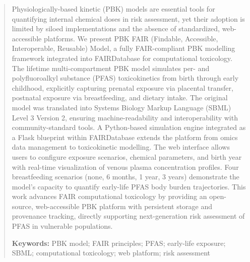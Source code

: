 \documentclass[preprint,12pt]{elsarticle}
\begin{document}
\begin{linenumbers}
\begin{abstract}
Physiologically-based kinetic (PBK) models are essential tools for
quantifying internal chemical doses in risk assessment, yet their
adoption is limited by siloed implementations and the absence of
standardized, web-accessible platforms. We present PBK FAIR (Findable, Accessible, Interoperable, Reusable) Model, a
fully FAIR-compliant 
PBK modelling framework integrated into FAIRDatabase for computational
toxicology. The lifetime multi-compartment PBK model simulates
per- and polyfluoroalkyl substance (PFAS) toxicokinetics from birth
through early childhood, explicitly capturing prenatal exposure via
placental transfer, postnatal exposure via breastfeeding, and dietary
intake. The original model was translated into Systems Biology Markup
Language (SBML) Level 3 Version 2, ensuring machine-readability and
interoperability with community-standard tools. A Python-based
simulation engine integrated as a Flask blueprint within FAIRDatabase
extends the platform from omics data management to toxicokinetic
modelling. The web interface allows users to configure exposure
scenarios, chemical parameters, and birth year with real-time
visualization of venous plasma concentration profiles. Four
breastfeeding scenarios (none, 6 months, 1 year, 3 years) demonstrate
the model's capacity to quantify early-life PFAS body burden
trajectories. This work advances FAIR computational toxicology by
providing an open-source, web-accessible PBK platform with persistent
storage and provenance tracking, directly supporting next-generation
risk assessment of PFAS in vulnerable populations.

\textbf{Keywords:} PBK model; FAIR principles; PFAS; early-life exposure;
SBML; computational toxicology; web platform; risk assessment
\end{abstract}



\end{linenumbers}
\end{document}
